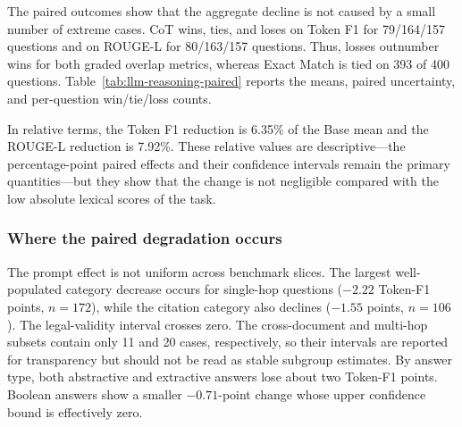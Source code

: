 The paired outcomes show that the aggregate decline is not caused by a small
number of extreme cases. CoT wins, ties, and loses on Token F1 for
79/164/157 questions and on ROUGE-L for 80/163/157 questions. Thus, losses
outnumber wins for both graded overlap metrics, whereas Exact Match is tied on
393 of 400 questions. Table~\ref{tab:llm-reasoning-paired} reports the means,
paired uncertainty, and per-question win/tie/loss counts.

\begin{table}[t]
\centering
\scriptsize
\caption{Primary paired GPT-4o-mini Base-versus-CoT comparison on 400
answerable questions. Deltas are CoT minus Base in percentage points; CIs
are percentile bootstrap intervals from 10,000 paired resamples.}
\label{tab:llm-reasoning-paired}
\end{table}

In relative terms, the Token F1 reduction is 6.35\% of the Base mean and the
ROUGE-L reduction is 7.92\%. These relative values are descriptive---the
percentage-point paired effects and their confidence intervals remain the
primary quantities---but they show that the change is not negligible compared
with the low absolute lexical scores of the task.

\subsubsection{Where the paired degradation occurs}

The prompt effect is not uniform across benchmark slices. The largest
well-populated category decrease occurs for single-hop questions
($-2.22$ Token-F1 points, $n=172$), while the citation category also declines
($-1.55$ points, $n=106$). The legal-validity interval crosses zero. The
cross-document and multi-hop subsets contain only 11 and 20 cases,
respectively, so their intervals are reported for transparency but should not
be read as stable subgroup estimates. By answer type, both abstractive and
extractive answers lose about two Token-F1 points. Boolean answers show a
smaller $-0.71$-point change whose upper confidence bound is effectively zero.


